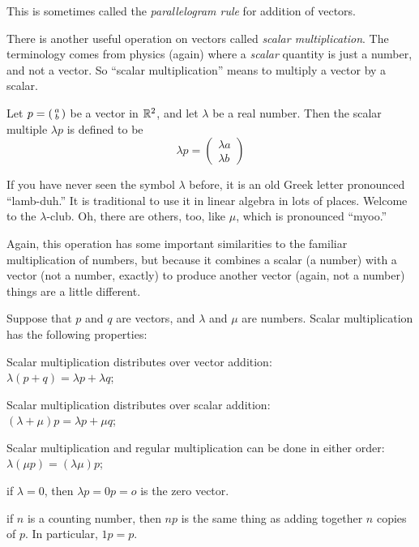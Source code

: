 \documentclass[00-livre-main.tex]{subfiles}
\begin{document}
This is sometimes called the \emph{parallelogram rule} for addition of vectors.

There is another useful operation on vectors called \emph{scalar multiplication}.
The terminology comes from physics (again) where a \emph{scalar} quantity is just a number, and not a vector.
So ``scalar multiplication'' means to multiply a vector by a scalar.


\begin{definition}
Let $p = \left(\begin{smallmatrix} a \\ b \end{smallmatrix}\right)$ be a vector in $\mathbb{R}^2$, and let $\lambda$ be a real number. Then the scalar multiple $\lambda p$ is defined to be
\[
\lambda p = \begin{pmatrix} \lambda a \\ \lambda b \end{pmatrix}
\]
\end{definition}

If you have never seen the symbol $\lambda$ before, it is an old Greek letter pronounced ``lamb-duh.'' It is traditional to use it in linear algebra in lots of places. Welcome to the $\lambda$-club. Oh, there are others, too, like $\mu$, which is pronounced ``myoo.''

Again, this operation has some important similarities to the familiar multiplication of numbers, but because it combines a scalar (a number) with a vector (not a number, exactly) to produce another vector (again, not a number) things are a little different.

\begin{theorem}\label{thm:scalar-mult}
Suppose that $p$ and $q$ are vectors, and $\lambda$ and $\mu$ are numbers. Scalar multiplication has the following properties:
\begin{compactitem}
\item Scalar multiplication distributes over vector addition:\\ $\lambda(p+q) = \lambda p + \lambda q$;
\item Scalar multiplication distributes over scalar addition:\\ $(\lambda + \mu)p = \lambda p + \mu q$;
\item Scalar multiplication and regular multiplication can be done in either order: $\lambda(\mu p) = (\lambda\mu) p$;
\item if $\lambda = 0$, then $\lambda p = 0 p = o$ is the zero vector.
\item if $n$ is a counting number, then $np$ is the same thing as adding together $n$ copies of $p$. In particular, $1p = p$.
\end{compactitem}
\end{theorem}
\end{document}
